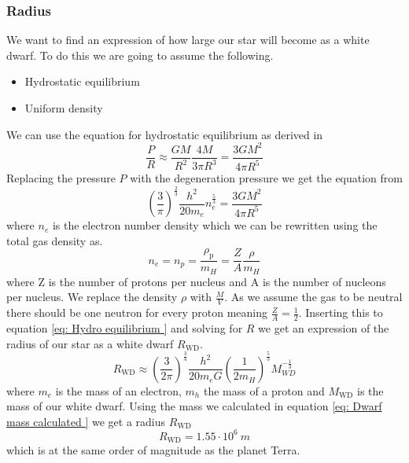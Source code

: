 \documentclass[reprint,english,notitlepage]{revtex4-2}
\begin{document}
\subsubsection*{Radius}
We want to find an expression of how large our star will become as a white dwarf. To do this we are going to assume the following. 
\begin{itemize}
  \item Hydrostatic equilibrium
  \item Uniform density
\end{itemize}

We can use the equation for hydrostatic equilibrium as derived in%
\begin{equation}\label{eq: Hydro equilibrium }
  \frac{P}{R} ≈  \frac{GM}{R^{2}} \frac{4M}{3 π R^{3}} = \frac{3GM^{2}}{4 π R^{5}}
\end{equation}
Replacing the pressure $ P $ with the degeneration pressure we get the equation from%
\begin{equation}\label{}
  \left( \frac{3}{π} \right) ^{\frac{2}{3}} \frac{h^{2}}{20m_e} n_{e}^{\frac{5}{3}} = \frac{3GM^{2}}{4 π R^{5}}
\end{equation}
where $ n_e $ is the electron number density which we can be rewritten using the total gas density as. 
\[
n_e = n_p = \frac{ρ_{\text{p}}}{m_{H}} = \frac{Z}{A} \frac{ρ}{m_{H}}
\]
where Z is the number of protons per nucleus and A is the number of nucleons per nucleus. We replace the density $ ρ $ with $ \frac{M}{V} $. As we assume the gas to be neutral there should be one neutron for every proton meaning $ \frac{Z}{A} = \frac{1}{2} $. Inserting this to equation \ref{eq: Hydro equilibrium } and solving for $ R $ we get an expression of the radius of our star as a white dwarf $ R_{\text{WD}} $. 
\begin{equation}\label{eq: Dwarf radius}
  R_{\text{WD}} ≈ \left( \frac{3}{2 π} \right) ^{\frac{3}{4}} \frac{h^{2}}{20 m_e G} \left( \frac{1}{2m_{H}} \right) ^{\frac{5}{3}} M_{WD} ^{-\frac{1}{3}}
\end{equation}
where $ m_e $ is the mass of an electron, $ m_h $ the mass of a proton and $ M_{\text{WD}} $ is the mass of our white dwarf. Using the mass we calculated in equation \ref{eq: Dwarf mass calculated } we get a radius $ R_{\text{WD}} $ 
\begin{equation}\label{eq: Darf radius calculated}
  R_{\text{WD}} = 1.55 ⋅ 10^{6}\ m 
\end{equation}
which is at the same order of magnitude as the planet Terra. 
\end{document}

